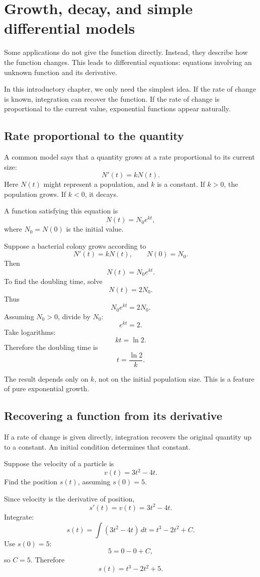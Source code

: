 \section{Growth, decay, and simple differential models}

Some applications do not give the function directly. Instead, they describe how the function changes. This leads to differential equations: equations involving an unknown function and its derivative.

In this introductory chapter, we only need the simplest idea. If the rate of change is known, integration can recover the function. If the rate of change is proportional to the current value, exponential functions appear naturally.

\subsection*{Rate proportional to the quantity}

A common model says that a quantity grows at a rate proportional to its current size:
\[
N'(t)=kN(t).
\]
Here \(N(t)\) might represent a population, and \(k\) is a constant. If \(k>0\), the population grows. If \(k<0\), it decays.

A function satisfying this equation is
\[
N(t)=N_0e^{kt},
\]
where \(N_0=N(0)\) is the initial value.

\begin{examplebox}
Suppose a bacterial colony grows according to
\[
N'(t)=kN(t),
\qquad
N(0)=N_0.
\]
Then
\[
N(t)=N_0e^{kt}.
\]
To find the doubling time, solve
\[
N(t)=2N_0.
\]
Thus
\[
N_0e^{kt}=2N_0.
\]
Assuming \(N_0>0\), divide by \(N_0\):
\[
e^{kt}=2.
\]
Take logarithms:
\[
kt=\ln2.
\]
Therefore the doubling time is
\[
t=\frac{\ln2}{k}.
\]
\end{examplebox}

The result depends only on \(k\), not on the initial population size. This is a feature of pure exponential growth.

\subsection*{Recovering a function from its derivative}

If a rate of change is given directly, integration recovers the original quantity up to a constant. An initial condition determines that constant.

\begin{examplebox}
Suppose the velocity of a particle is
\[
v(t)=3t^2-4t.
\]
Find the position \(s(t)\), assuming \(s(0)=5\).

Since velocity is the derivative of position,
\[
s'(t)=v(t)=3t^2-4t.
\]
Integrate:
\[
s(t)=\int (3t^2-4t)\,dt=t^3-2t^2+C.
\]
Use \(s(0)=5\):
\[
5=0-0+C,
\]
so \(C=5\). Therefore
\[
s(t)=t^3-2t^2+5.
\]
\end{examplebox}

